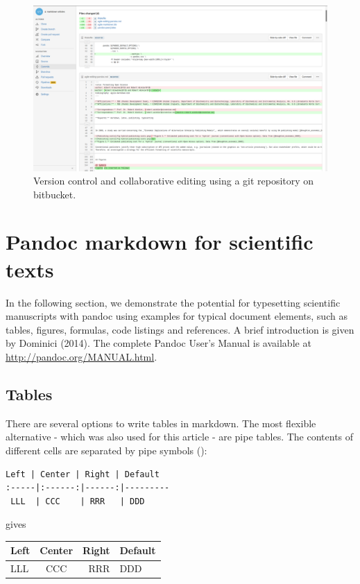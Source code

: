 \documentclass[10pt,fleqn]{wlpeerj}
\begin{document}
\begin{figure}[htbp]
\centering
\includegraphics{fig-bitbucket-diff.png}
\caption{Version control and collaborative editing using a git
repository on bitbucket.}
\end{figure}

\section{Pandoc markdown for scientific
texts}\label{pandoc-markdown-for-scientific-texts}

In the following section, we demonstrate the potential for typesetting
scientific manuscripts with pandoc using examples for typical document
elements, such as tables, figures, formulas, code listings and
references. A brief introduction is given by Dominici (2014). The
complete Pandoc User's Manual is available at
\url{http://pandoc.org/MANUAL.html}.

\subsection{Tables}\label{tables}

There are several options to write tables in markdown. The most flexible
alternative - which was also used for this article - are pipe tables.
The contents of different cells are separated by pipe symbols
(\texttt{\textbar{}}):

\begin{verbatim}
Left | Center | Right | Default
:-----|:------:|------:|---------
 LLL  | CCC    | RRR   | DDD
\end{verbatim}

gives

\begin{longtable}[c]{@{}lcrl@{}}
\toprule
Left & Center & Right & Default\tabularnewline
\midrule
\endhead
LLL & CCC & RRR & DDD\tabularnewline
\bottomrule
\end{longtable}
\end{document}
